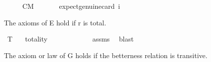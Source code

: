 \begin{isabellebody}
%
\isadelimproof
\ \ %
\endisadelimproof
%
\isatagproof
{}\isamarkupfalse%
%
\endisatagproof
{\isafoldproof}%
%
\isadelimproof
\ \isanewline
%
\endisadelimproof
\isanewline
{}\isamarkupfalse%
\ CM{\isacharcolon}{\kern0pt}\ {\isachardoublequoteopen}{\isasymlfloor}{\isacharparenleft}{\kern0pt}{\isasymcirc}{\isacharless}{\kern0pt}{\isasympsi}{\isacharbar}{\kern0pt}{\isasymphi}{\isachargreater}{\kern0pt}\isactrlbold {\isasymand}{\isasymcirc}{\isacharless}{\kern0pt}{\isasymchi}{\isacharbar}{\kern0pt}{\isasymphi}{\isachargreater}{\kern0pt}{\isacharparenright}{\kern0pt}\isactrlbold {\isasymrightarrow}\ {\isasymcirc}{\isacharless}{\kern0pt}{\isasymchi}{\isacharbar}{\kern0pt}{\isasymphi}\isactrlbold {\isasymand}{\isasympsi}{\isachargreater}{\kern0pt}{\isasymrfloor}{\isachardoublequoteclose}\ \isanewline
\ \ \isamarkupfalse%
\ {\isacharbrackleft}{\kern0pt}expect{\isacharequal}{\kern0pt}genuine{\isacharcomma}{\kern0pt}card\ i{\isacharequal}{\kern0pt}{}{\isacharbrackright}{\kern0pt}\ %
\ \isanewline
%
\isadelimproof
\ \ %
\endisadelimproof
%
\isatagproof
{}\isamarkupfalse%
%
\endisatagproof
{\isafoldproof}%
%
\isadelimproof
%
\endisadelimproof
%
\isadelimdocument
%
\endisadelimdocument
%
\isatagdocument
%
\isamarkuptrue%
%
\endisatagdocument
{\isafolddocument}%
%
\isadelimdocument
%
\endisadelimdocument
%
\begin{isamarkuptext}%
The axioms of E hold if r is total.%
\end{isamarkuptext}\isamarkuptrue%
\isamarkupfalse%
\ T{}{}{\isacharcolon}{\kern0pt}\isanewline
\ \ \ totality\isanewline
\ \ \ {\isachardoublequoteopen}{\isasymlfloor}{\isasymdiamond}{\isasymphi}\ \isactrlbold {\isasymrightarrow}\ {\isacharparenleft}{\kern0pt}{\isasymcirc}{\isacharless}{\kern0pt}{\isasympsi}{\isacharbar}{\kern0pt}{\isasymphi}{\isachargreater}{\kern0pt}\ \isactrlbold {\isasymrightarrow}\ {\isasymintegral}{\isacharless}{\kern0pt}{\isasympsi}{\isacharbar}{\kern0pt}{\isasymphi}{\isachargreater}{\kern0pt}{\isacharparenright}{\kern0pt}{\isasymrfloor}{\isachardoublequoteclose}\ \isanewline
%
\isadelimproof
\ \ %
\endisadelimproof
%
\isatagproof
{}\isamarkupfalse%
\ assms\ \isamarkupfalse%
\ blast%
\endisatagproof
{\isafoldproof}%
%
\isadelimproof
%
\endisadelimproof
%
\begin{isamarkuptext}%
The axiom or law of G holds if the betterness relation is transitive.%

\end{isamarkuptext}
\end{isabellebody}

